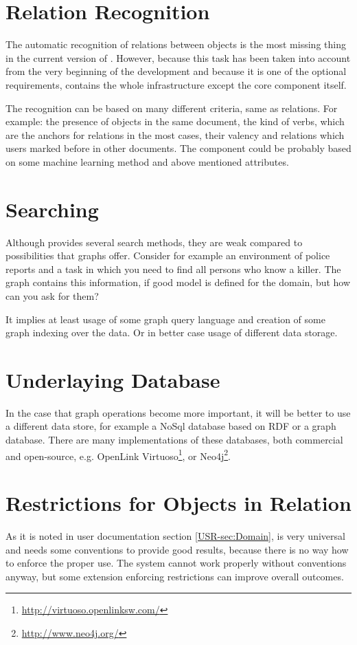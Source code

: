 

\section{Relation Recognition}
The automatic recognition of relations between objects is the most missing thing
in the current version of \textan{}. However, because this task has been taken
into account from the very beginning of the development and because it is one of
the optional requirements, \textan{} contains the whole infrastructure except
the core component itself.

The recognition can be based on many different criteria, same as relations.
For example: the presence of objects in the same document, the kind of verbs,
which are the anchors for relations in the most cases, their valency and
relations which users marked before in other documents. The component could be
probably based on some machine learning method and above mentioned attributes.

\section{Searching}
Although \textan{} provides several search methods, they are weak compared to
possibilities that graphs offer. Consider for example an environment of police
reports and a task in which you need to find all persons who know a killer. The
graph contains this information, if good model is defined for the domain, but
how can you ask for them?

It implies at least usage of some graph query language and creation of some
graph indexing over the data. Or in better case usage of different data storage. 

\section{Underlaying Database}
In the case that graph operations become more important, it will be better to use
a different data store, for example a NoSql database based on RDF or a graph
database. There are many implementations of these databases, both commercial and
open-source, e.g. OpenLink Virtuoso\footnote{\url{http://virtuoso.openlinksw.com/}},
or Neo4j\footnote{\url{http://www.neo4j.org/}}.

\section{Restrictions for Objects in Relation}
As it is noted in user documentation section \ref{USR-sec:Domain},
\textan{} is very universal and needs some conventions to provide good results,
because there is no way how to enforce the proper use. The system cannot work
properly without conventions anyway, but some extension enforcing restrictions
can improve overall outcomes.

